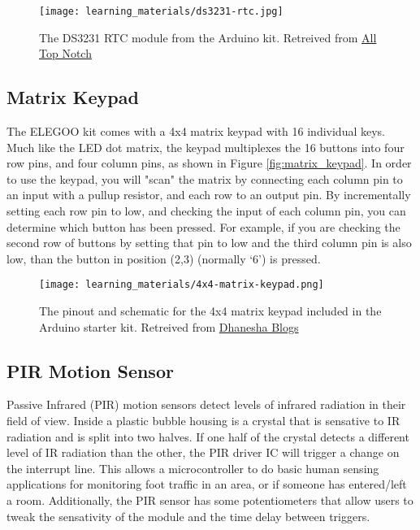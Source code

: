     \begin{figure}[h]
        \texttt{[image: learning\_materials/ds3231-rtc.jpg]}
        \caption[DS3231 RTC Module]{The DS3231 RTC module from the Arduino kit. 
        Retreived from \href{https://alltopnotch.co.uk/wp-content/uploads/imported/9/RTC-Real-Time-Clock-DS3231-I2C-AT24C32-Board-Module-Arduino-ARM-PIC-UK-Seller-361515587149-4.JPG}
        {All Top Notch}}
    \end{figure}

    \subsection*{Matrix Keypad}
    The ELEGOO kit comes with a 4x4 matrix keypad with 16 individual keys.
    Much like the LED dot matrix, the keypad multiplexes the 16 buttons into four row pins, and four column pins, as shown in Figure \ref{fig:matrix_keypad}.
    In order to use the keypad, you will "scan" the matrix by connecting each column pin to an input with a pullup resistor, and each row to an output pin.
    By incrementally setting each row pin to low, and checking the input of each column pin, you can determine which button has been pressed.
    For example, if you are checking the second row of buttons by setting that pin to low and the third column pin is also low, than the button in position (2,3) (normally `6') is pressed.

    \begin{figure}[h]
        \texttt{[image: learning\_materials/4x4-matrix-keypad.png]}
        \caption[4x4 Matrix Keypad]{The pinout and schematic for the 4x4 matrix keypad included in the Arduino starter kit. 
        Retreived from \href{https://dhaneshablogs.blogspot.com/2019/08/interfacing-4x4-matrix-keypad-with.html}
        {Dhanesha Blogs}}
    \end{figure}

    \subsection*{PIR Motion Sensor}
    Passive Infrared (PIR) motion sensors detect levels of infrared radiation in their field of view.
    Inside a plastic bubble housing is a crystal that is sensative to IR radiation and is split into two halves.
    If one half of the crystal detects a different level of IR radiation than the other, the PIR driver IC will trigger a change on the interrupt line.
    This allows a microcontroller to do basic human sensing applications for monitoring foot traffic in an area, or if someone has entered/left a room.
    Additionally, the PIR sensor has some potentiometers that allow users to tweak the sensativity of the module and the time delay between triggers.

